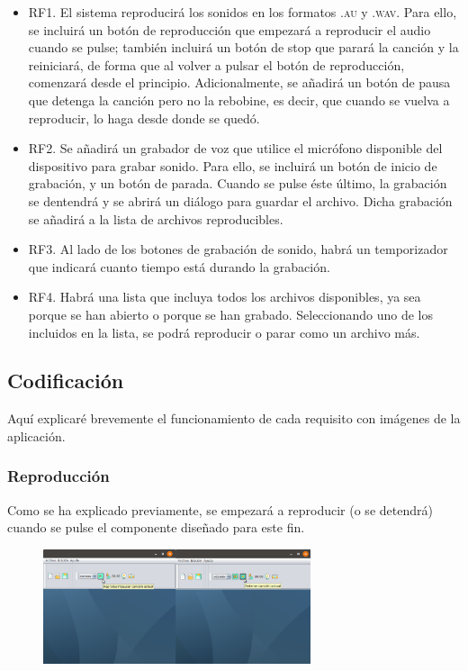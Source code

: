 \documentclass[11pt,a4paper]{article}
\begin{document}
\begin{itemize}
	\item RF1. El sistema reproducirá los sonidos en los formatos \textsc{.au} y \textsc{.wav}. Para ello, se incluirá un botón de reproducción que empezará a reproducir el audio cuando se pulse; también incluirá un botón de stop que parará la canción y la reiniciará, de forma que al volver a pulsar el botón de reproducción, comenzará desde el principio. Adicionalmente, se añadirá un botón de pausa que detenga la canción pero no la rebobine, es decir, que cuando se vuelva a reproducir, lo haga desde donde se quedó.
	\item RF2. Se añadirá un grabador de voz que utilice el micrófono disponible del dispositivo para grabar sonido. Para ello, se incluirá un botón de inicio de grabación, y un botón de parada. Cuando se pulse éste último, la grabación se dentendrá y se abrirá un diálogo para guardar el archivo. Dicha grabación se añadirá a la lista de archivos reproducibles.
	\item RF3. Al lado de los botones de grabación de sonido, habrá un temporizador que indicará cuanto tiempo está durando la grabación.
	\item RF4. Habrá una lista que incluya todos los archivos disponibles, ya sea porque se han abierto o porque se han grabado. Seleccionando uno de los incluidos en la lista, se podrá reproducir o parar como un archivo más.
\end{itemize}

\subsection{Codificación}
Aquí explicaré brevemente el funcionamiento de cada requisito con imágenes de la aplicación.

\subsubsection{Reproducción}
Como se ha explicado previamente, se empezará a reproducir (o se detendrá) cuando se pulse el componente diseñado para este fin.\\

\begin{figure}[H]
\centering
	\includegraphics[width=0.7\textwidth]{img/play-stop.png}
\end{figure}
\end{document}
